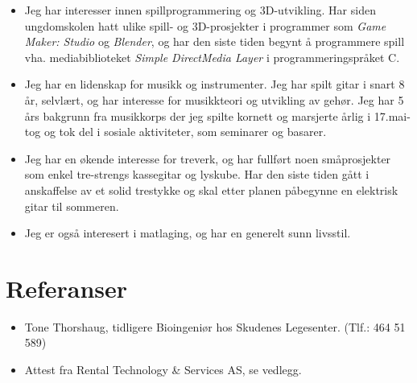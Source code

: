 \documentclass[11pt,a4paper,sans,norsk]{moderncv}        %
\begin{document}
\begin{itemize}

\item{Jeg har interesser innen spillprogrammering og 3D-utvikling. Har siden ungdomskolen hatt ulike spill- og 3D-prosjekter i programmer som \textit{Game Maker: Studio} og \textit{Blender}, og har den siste tiden begynt å programmere spill vha. mediabiblioteket \textit{Simple DirectMedia Layer} i programmeringspråket C.}

\vspace{6pt}

\item{Jeg har en lidenskap for musikk og instrumenter. Jeg har spilt gitar i snart 8 år, selvlært, og har interesse for musikkteori og utvikling av gehør. Jeg har 5 års bakgrunn fra musikkorps der jeg spilte kornett og marsjerte årlig i 17.mai-tog og tok del i sosiale aktiviteter, som seminarer og basarer.}

\vspace{6pt}

\item{Jeg har en økende interesse for treverk, og har fullført noen småprosjekter som enkel tre-strengs kassegitar og lyskube. Har den siste tiden gått i anskaffelse av et solid trestykke og skal etter planen påbegynne en elektrisk gitar til sommeren.}

\vspace{6pt}

\item{Jeg er også interesert i matlaging, og har en generelt sunn livsstil.}

\end{itemize}

\section{Referanser}

\vspace{6pt}
 
\begin{itemize}


\item{Tone Thorshaug, tidligere Bioingeniør hos Skudenes Legesenter.	(Tlf.: 464 51 589)}
\item{Attest fra Rental Technology \& Services AS, se vedlegg.}

\end{itemize}

\vspace{12pt}



\newpage


\end{document}

